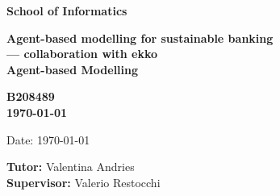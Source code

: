\documentclass[a4paper,11pt]{article}
\newcommand{\examnumber}{B208489}
\newcommand{\field}{Agent-based Modelling}
\newcommand{\tutor}{Valentina Andries}
\newcommand{\supervisor}{Valerio Restocchi}
\begin{document}
\begin{minipage}[b]{110mm}
        {\Huge\bf School of Informatics
        \vspace*{17mm}}
\end{minipage}
\hfill
\begin{minipage}[t]{40mm}               
\end{minipage}
\par\noindent
\vspace*{2cm}
\begin{center}
        \Large\bf Agent-based modelling for sustainable banking  \\
         \Large\bf --- collaboration with ekko\\
        \Large\bf \field
\end{center}
\vspace*{1.5cm}
\begin{center}
        \bf \examnumber\\
        \monthyeardate\today
\end{center}
\vspace*{5mm}

%
%                       
\begin{abstract}
        Ecosystems are under threat from climate change. However, the link between reducing carbon emissions and spending behaviour exists, and the project aims to use the link to reduce the individual carbon footprint.
The project uses an agent-based modelling approach to analyse people spending habits and discovers new influence maximisation strategies to encourage people to purchase at sustainable companies.
\end{abstract}

\vspace*{1cm}

\vspace*{3cm}
Date: \today

\vfill
{\bf Tutor:} \tutor\\
{\bf Supervisor:} \supervisor
\newpage
\end{document}
